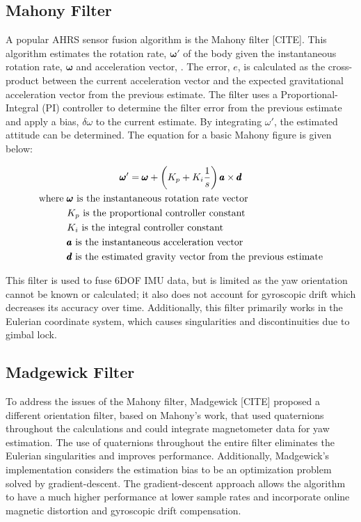 \subsection{Mahony Filter} \label{ssec:bkg_mahony_filter}
A popular AHRS sensor fusion algorithm is the Mahony filter [CITE].
This algorithm estimates the rotation rate, $\pmb{\omega}'$ of the body given the instantaneous rotation rate, $\pmb{\omega}$ and acceleration vector, .
The error, $e$, is calculated as the cross-product between the current acceleration vector and the expected gravitational acceleration vector from the previous estimate.
The filter uses a Proportional-Integral (PI) controller to determine the filter error from the previous estimate and apply a bias, $\delta\omega$ to the current estimate.
By integrating $\omega'$, the estimated attitude can be determined.
The equation for a basic Mahony figure is given below:

\begin{gather}
    \label{eq:mahony_filter}
    \pmb{\omega}' = \pmb{\omega} + \left(K_p + K_i\frac{1}{s}\right) \pmb{a} \times \pmb{d} \\
    \begin{aligned}
        \text{where } & \pmb{\omega} \text{ is the instantaneous rotation rate vector} \\
        & K_p \text{ is the proportional controller constant} \\
        & K_i \text{ is the integral controller constant} \\
        & \pmb{a} \text{ is the instantaneous acceleration vector} \\
        & \pmb{d} \text{ is the estimated gravity vector from the previous estimate} \\
    \end{aligned} \notag
\end{gather}

This filter is used to fuse 6DOF IMU data, but is limited as the yaw orientation cannot be known or calculated; it also does not account for gyroscopic drift which decreases its accuracy over time.
Additionally, this filter primarily works in the Eulerian coordinate system, which causes singularities and discontinuities due to gimbal lock.

\subsection{Madgewick Filter} \label{ssec:bkg_madgewick_filter}
To address the issues of the Mahony filter, Madgewick [CITE] proposed a different orientation filter, based on Mahony's work, that used quaternions throughout the calculations and could integrate magnetometer data for yaw estimation.
The use of quaternions throughout the entire filter eliminates the Eulerian singularities and improves performance.
Additionally, Madgewick's implementation considers the estimation bias to be an optimization problem solved by gradient-descent.
The gradient-descent approach allows the algorithm to have a much higher performance at lower sample rates and incorporate online magnetic distortion and gyroscopic drift compensation.

